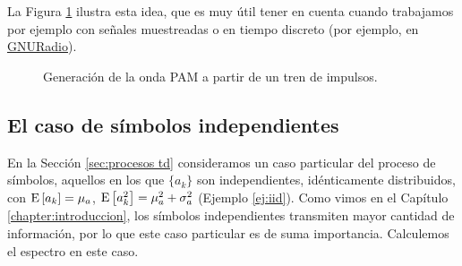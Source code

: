 La Figura \ref{fig:generacion pulso} ilustra esta idea, que es muy útil tener en cuenta cuando trabajamos por ejemplo con señales muestreadas o en tiempo discreto (por ejemplo, en \href{https://www.gnuradio.org/}{GNURadio}).

\begin{figure}
    \begin{center}
    \end{center}
    \caption{Generación de la onda PAM a partir de un tren de impulsos.}\label{fig:generacion pulso}
\end{figure}

\subsection{El caso de símbolos independientes}

En la Sección \ref{sec:procesos td} consideramos un caso particular del proceso de símbolos, aquellos en los que $\{a_k\}$ son independientes, idénticamente distribuidos, con $\mathrm{E}\left[a_k\right]=\mu_a$, $\mathrm{E}\left[a_k^2\right]=\mu_a^2+\sigma_a^2$ (Ejemplo \ref{ej:iid}). Como vimos en el Capítulo \ref{chapter:introduccion}, los símbolos independientes transmiten mayor cantidad de información, por lo que este caso particular es de suma importancia. Calculemos el espectro en este caso.


